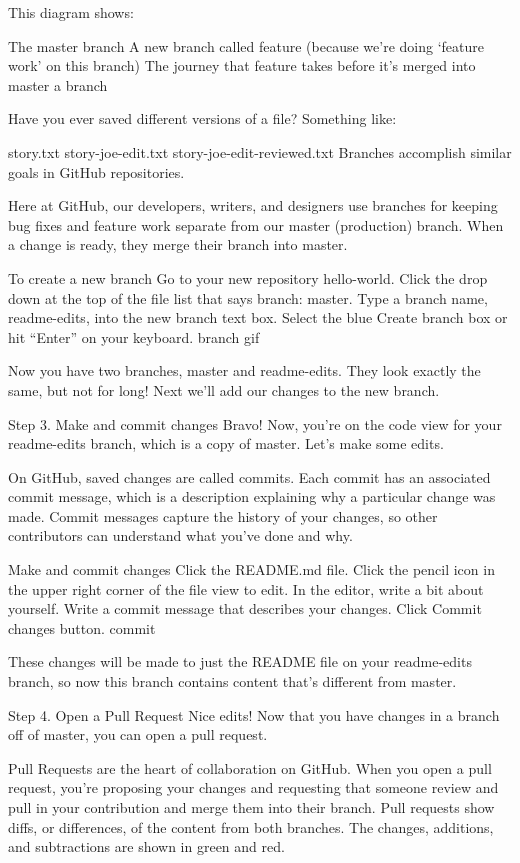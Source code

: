 This diagram shows:

The master branch
A new branch called feature (because we’re doing ‘feature work’ on this branch)
The journey that feature takes before it’s merged into master
a branch

Have you ever saved different versions of a file? Something like:

story.txt
story-joe-edit.txt
story-joe-edit-reviewed.txt
Branches accomplish similar goals in GitHub repositories.

Here at GitHub, our developers, writers, and designers use branches for keeping bug fixes and feature work separate from our master (production) branch. When a change is ready, they merge their branch into master.

To create a new branch
Go to your new repository hello-world.
Click the drop down at the top of the file list that says branch: master.
Type a branch name, readme-edits, into the new branch text box.
Select the blue Create branch box or hit “Enter” on your keyboard.
branch gif

Now you have two branches, master and readme-edits. They look exactly the same, but not for long! Next we’ll add our changes to the new branch.


Step 3. Make and commit changes
Bravo! Now, you’re on the code view for your readme-edits branch, which is a copy of master. Let’s make some edits.

On GitHub, saved changes are called commits. Each commit has an associated commit message, which is a description explaining why a particular change was made. Commit messages capture the history of your changes, so other contributors can understand what you’ve done and why.

Make and commit changes
Click the README.md file.
Click the  pencil icon in the upper right corner of the file view to edit.
In the editor, write a bit about yourself.
Write a commit message that describes your changes.
Click Commit changes button.
commit

These changes will be made to just the README file on your readme-edits branch, so now this branch contains content that’s different from master.


Step 4. Open a Pull Request
Nice edits! Now that you have changes in a branch off of master, you can open a pull request.

Pull Requests are the heart of collaboration on GitHub. When you open a pull request, you’re proposing your changes and requesting that someone review and pull in your contribution and merge them into their branch. Pull requests show diffs, or differences, of the content from both branches. The changes, additions, and subtractions are shown in green and red.

